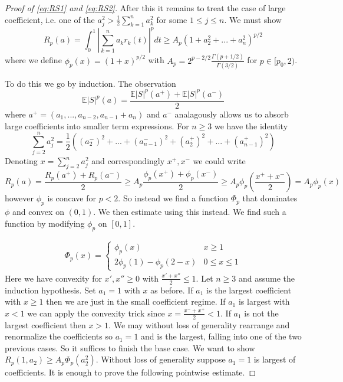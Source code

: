\documentclass[10pt]{article}
\newcommand{\E}{\mathbb{E}}
\newcommand{\1}{\textbf{1}}
\theoremstyle{remark}
\theoremstyle{definition}
\begin{document}
\begin{proof}[Proof of \ref{eq:RS1} and \ref{eq:RS2}]
	After this it remains to treat the case of large coefficient, i.e. one of the $a_j^2 > \frac{1}{2}\sum_{k=1}^na_k^2$ for some $1 \leq j \leq n$. We must show
	\begin{equation*}
		R_p(a) = \int_0^1|\sum_{k=1}^n a_kr_k(t)|^p dt \geq A_p(1+a_2^2+...+a_n^2)^{p/2}
	\end{equation*}
	where we define $\phi_p(x) = (1+x)^ {p/2}$ with $A_p = 2^{p-2/2}\frac{\Gamma(p+1/2)}{\Gamma(3/2)}$ for $p \in [p_0,2)$. 

	To do this we go by induction. The observation
	\begin{equation*}
		\E|S|^p(a) = \frac{\E|S|^p(a^+) + \E|S|^p(a^-)}{2}
	\end{equation*} where $a^+ = (a_1,...,a_{n-2},a_{n-1}+a_n)$ and $a^-$ analagously allows us to absorb large coefficients into smaller term expressions. For $n \geq 3$ we have the identity
	\begin{equation*}
		\sum_{j=2}^n a_j^2 = \frac{1}{2}((a_2^-)^2 + ... +(a_{n-1}^-)^2 + (a_2^+)^2 + ... + (a_{n-1}^+)^2)
	\end{equation*} Denoting $x = \sum_{j=2}^n a_j^2$ and correspondingly $x^+,x^-$ we could write
	\begin{equation*}
		R_p(a) = \frac{R_p(a^+)+R_p(a^-)}{2} \geq A_p \frac{\phi_p(x^+)+\phi_p(x^-)}{2} \geq A_p \phi_p(\frac{x^++x^-}{2}) = A_p \phi_p(x)
	\end{equation*} however $\phi_p$ is concave for $p < 2$. So instead we find a function $\Phi_p$ that dominates $\phi$ and convex on $(0,1)$. We then estimate using this instead. We find such a function by modifying $\phi_p$ on $[0,1]$.

	\begin{align*}
		\Phi_p(x) = 
		\begin{cases}
			\phi_p(x) & x \geq 1\\
			2 \phi_p(1) - \phi_p(2-x) & 0 \leq x \leq 1
		\end{cases}
	\end{align*} Here we have convexity for $x',x'' \geq 0$ with $\frac{x'+x''}{2} \leq 1$. Let $n \geq 3$ and assume the induction hypothesis. Set $a_1 = 1$ with $x$ as before. If $a_1$ is the largest coefficient with $x \geq 1$ then we are just in the small coefficient regime. If $a_1$ is largest with $x < 1$ we can apply the convexity trick since $x = \frac{x^-+x^+}{2} < 1$. If $a_1$ is not the largest coefficient then $x > 1$. We may without loss of generality rearrange and renormalize the coefficients so $a_1 =1$ and is the largest, falling into one of the two previous cases. So it suffices to finish the base case. We want to show $R_p(1,a_2) \geq A_p \Phi_p(a_2^2)$. Without loss of generality suppose $a_1 =1$ is largest of coefficients. It is enough to prove the following pointwise estimate.


\end{proof}
\end{document}
